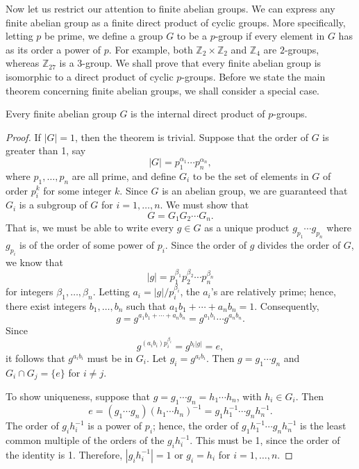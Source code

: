 \medskip
 
Now let us restrict our attention to finite abelian groups. We can
express any finite abelian group as a finite direct product of cyclic
groups. More specifically, letting $p$ be prime, we define a group $G$
to be a {\bfi $p$-group\/} if every element in 
$G$ has as its order a power of $p$. For example, both ${\mathbb Z}_2 
\times {\mathbb Z}_2$ and ${\mathbb Z}_4$ are $2$-groups, whereas 
${\mathbb Z}_{27}$ is a $3$-group. We shall prove that every finite 
abelian group is isomorphic to a direct product of cyclic $p$-groups. 
Before we  state the main theorem concerning finite abelian groups, we 
shall consider a special case.
 
 
\begin{theorem}
Every finite abelian group $G$ is the internal direct product of $p$-groups. 
\end{theorem}


 
\begin{proof}
If $|G|= 1$, then the theorem is trivial.  Suppose that the order of
$G$ is greater than 1, say 
\[
|G| = p_1^{\alpha_1} \cdots p_n^{\alpha_n},
\]
where $p_1, \ldots, p_n$ are all prime, and define $G_i$ to be the set
of elements in $G$ of order $p_i^k$ for some integer $k$. Since $G$ is
an abelian group, we are guaranteed that $G_i$ is a subgroup of $G$
for $i = 1, \ldots, n$. We must show that
\[
G = G_1 G_2 \cdots  G_n.
\]
That is, we must be able to write every $g \in G$ as a unique product
$g_{p_1} \cdots g_{p_n}$ where $g_{p_i}$ is of the order of some power
of $p_i$. Since the order of $g$ divides the order of $G$, we know
that 
\[
|g| = p_1^{\beta_1}  p_2^{\beta_2} \cdots p_n^{\beta_n}
\]
for integers $\beta_1, \ldots, \beta_n$. Letting $a_i = |g| /
p_i^{\beta_i}$, the $a_i$'s are relatively prime; hence, there exist
integers $b_1, \ldots, b_n$ such that $a_1 b_1 + \cdots + a_n b_n =
1$. Consequently, 
\[
g = g^{a_1 b_1 + \cdots + a_n b_n} = g^{a_1 b_1} \cdots  g^{a_n b_n}. 
\]
Since
\[
g^{(a_i b_i ) p_i^{\beta_i}} = g^{b_i |g|} = e,
\]
it follows that $g^{a_i b_i}$ must be in $G_{i}$. Let $g_i =
g^{a_i b_i}$. Then $g = g_1 \cdots g_n$ and $G_i \cap G_j = \{ e \}$ for $i
\neq j$. 
 
 
To show uniqueness, suppose that $g = g_1 \cdots g_n = h_1 \cdots h_n$,
with $h_i \in G_i$. Then
\[
e = (g_1 \cdots g_n)(h_1 \cdots h_n)^{-1} = g_1 h_1^{-1} \cdots g_n
h_n^{-1}. 
\]
The order of $g_i h_i^{-1}$ is a power of $p_i$; hence, the order of
$g_1 h_1^{-1} \cdots g_n h_n^{-1}$ is the least common multiple of the
orders of the $g_i h_i^{-1}$.  This must be 1, since the order of the
identity is 1. Therefore, $|g_i h_i^{-1}| =1$ or $g_i =h_i$ for $i =
1, \ldots, n$.
\mbox{\hspace{1in}}
\end{proof}
 
